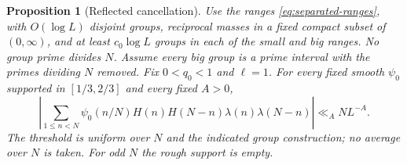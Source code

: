 \documentclass[11pt]{article}
\newtheorem{proposition}[theorem]{Proposition}
\theoremstyle{definition}
\theoremstyle{remark}
\begin{document}
\begin{proposition}[Reflected cancellation]\label{prop:cancellation}
Use the ranges \eqref{eq:separated-ranges}, with $O(\log L)$ disjoint
groups, reciprocal masses in a fixed compact subset of $(0,\infty)$,
and at least $c_0\log L$ groups in each of the small and big ranges.
No group prime divides $N$. Assume every big group is a prime
interval with the primes dividing $N$ removed. Fix $0<q_0<1$ and
$\ell=1$. For every fixed smooth $\psi_0$ supported in $[1/3,2/3]$
and every fixed $A>0$,
\begin{equation}\label{eq:reflected-cancellation}
\left|\sum_{1\le n<N}\psi_0(n/N)H(n)H(N-n)
                       \lambda(n)\lambda(N-n)\right|
\ll_A NL^{-A}.
\end{equation}
The threshold is uniform over $N$ and the indicated group construction; no average over $N$ is taken.
For odd $N$ the rough support is empty.
\end{proposition}
\end{document}
